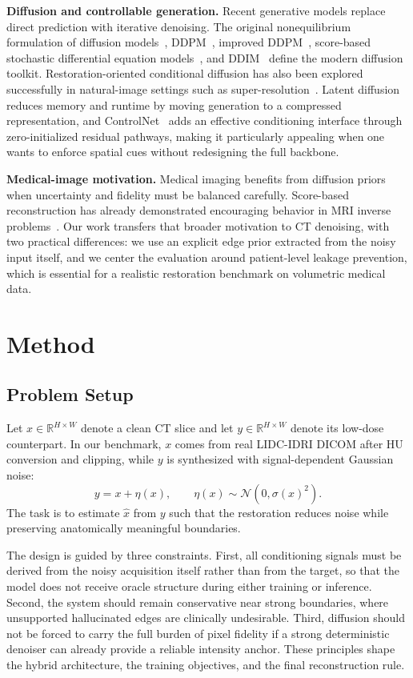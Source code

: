 \documentclass{article}
\begin{document}
\textbf{Diffusion and controllable generation.}
Recent generative models replace direct prediction with iterative denoising. The original nonequilibrium formulation of diffusion models~\cite{sohldickstein2015}, DDPM~\cite{ho2020}, improved DDPM~\cite{nichol2021}, score-based stochastic differential equation models~\cite{song2021sde}, and DDIM~\cite{song2021ddim} define the modern diffusion toolkit. Restoration-oriented conditional diffusion has also been explored successfully in natural-image settings such as super-resolution~\cite{saharia2021}. Latent diffusion~\cite{rombach2022} reduces memory and runtime by moving generation to a compressed representation, and ControlNet~\cite{zhang2023controlnet} adds an effective conditioning interface through zero-initialized residual pathways, making it particularly appealing when one wants to enforce spatial cues without redesigning the full backbone.

\textbf{Medical-image motivation.}
Medical imaging benefits from diffusion priors when uncertainty and fidelity must be balanced carefully. Score-based reconstruction has already demonstrated encouraging behavior in MRI inverse problems~\cite{chung2022}. Our work transfers that broader motivation to CT denoising, with two practical differences: we use an explicit edge prior extracted from the noisy input itself, and we center the evaluation around patient-level leakage prevention, which is essential for a realistic restoration benchmark on volumetric medical data.

\section{Method}
\subsection{Problem Setup}
Let $x \in \mathbb{R}^{H \times W}$ denote a clean CT slice and let $y \in \mathbb{R}^{H \times W}$ denote its low-dose counterpart. In our benchmark, $x$ comes from real LIDC-IDRI DICOM after HU conversion and clipping, while $y$ is synthesized with signal-dependent Gaussian noise:
\begin{equation}
    y = x + \eta(x), \qquad \eta(x) \sim \mathcal{N}\!\left(0,\sigma(x)^2\right).
\end{equation}
The task is to estimate $\hat{x}$ from $y$ such that the restoration reduces noise while preserving anatomically meaningful boundaries.

The design is guided by three constraints. First, all conditioning signals must be derived from the noisy acquisition itself rather than from the target, so that the model does not receive oracle structure during either training or inference. Second, the system should remain conservative near strong boundaries, where unsupported hallucinated edges are clinically undesirable. Third, diffusion should not be forced to carry the full burden of pixel fidelity if a strong deterministic denoiser can already provide a reliable intensity anchor. These principles shape the hybrid architecture, the training objectives, and the final reconstruction rule.
\end{document}
